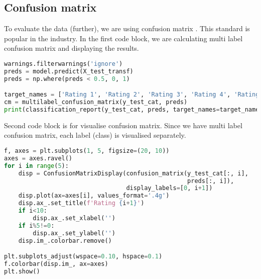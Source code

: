\subsection{Confusion matrix}
To evaluate the data (further), we are using confusion matrix \parencite{visa2011confusion}. This standard is popular in the industry. 
In the first code block, we are calculating multi label confusion matrix and displaying the results.
\begin{lstlisting}[language=Python, caption=Calculate confusion matrix]
warnings.filterwarnings('ignore')
preds = model.predict(X_test_transf)
preds = np.where(preds < 0.5, 0, 1)

target_names = ['Rating 1', 'Rating 2', 'Rating 3', 'Rating 4', 'Rating 5']
cm = multilabel_confusion_matrix(y_test_cat, preds)
print(classification_report(y_test_cat, preds, target_names=target_names))
\end{lstlisting}
Second code block is for visualise confusion matrix. Since we have multi label confusion matrix, each label (class) is visualised separately.
\begin{lstlisting}[language=Python, caption=Visualise confusion matrix]
f, axes = plt.subplots(1, 5, figsize=(20, 10))
axes = axes.ravel()
for i in range(5):
    disp = ConfusionMatrixDisplay(confusion_matrix(y_test_cat[:, i],
                                                   preds[:, i]),
                                  display_labels=[0, i+1])
    disp.plot(ax=axes[i], values_format='.4g')
    disp.ax_.set_title(f'Rating {i+1}')
    if i<10:
        disp.ax_.set_xlabel('')
    if i%5!=0:
        disp.ax_.set_ylabel('')
    disp.im_.colorbar.remove()

plt.subplots_adjust(wspace=0.10, hspace=0.1)
f.colorbar(disp.im_, ax=axes)
plt.show()
\end{lstlisting}
